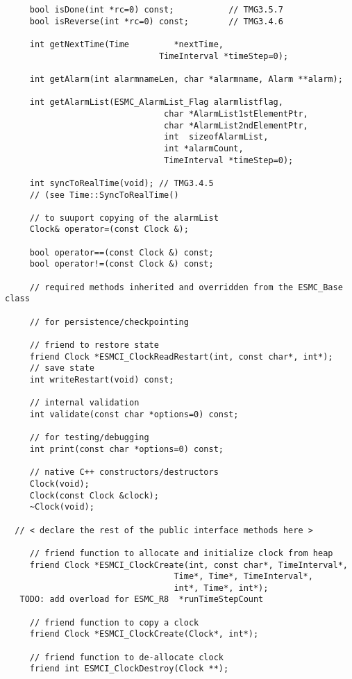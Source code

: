 \begin{verbatim}
     bool isDone(int *rc=0) const;           // TMG3.5.7
     bool isReverse(int *rc=0) const;        // TMG3.4.6
 
     int getNextTime(Time         *nextTime,
                               TimeInterval *timeStep=0);
 
     int getAlarm(int alarmnameLen, char *alarmname, Alarm **alarm);
 
     int getAlarmList(ESMC_AlarmList_Flag alarmlistflag,
                                char *AlarmList1stElementPtr, 
                                char *AlarmList2ndElementPtr,
                                int  sizeofAlarmList, 
                                int *alarmCount,
                                TimeInterval *timeStep=0);
 
     int syncToRealTime(void); // TMG3.4.5
     // (see Time::SyncToRealTime()
 
     // to suuport copying of the alarmList
     Clock& operator=(const Clock &);
 
     bool operator==(const Clock &) const;
     bool operator!=(const Clock &) const;
 
     // required methods inherited and overridden from the ESMC_Base class
 
     // for persistence/checkpointing
 
     // friend to restore state
     friend Clock *ESMCI_ClockReadRestart(int, const char*, int*);
     // save state
     int writeRestart(void) const;
 
     // internal validation
     int validate(const char *options=0) const;
 
     // for testing/debugging
     int print(const char *options=0) const;
 
     // native C++ constructors/destructors
     Clock(void);
     Clock(const Clock &clock);
     ~Clock(void);
 
  // < declare the rest of the public interface methods here >
 
     // friend function to allocate and initialize clock from heap
     friend Clock *ESMCI_ClockCreate(int, const char*, TimeInterval*,
                                  Time*, Time*, TimeInterval*,
                                  int*, Time*, int*);
   TODO: add overload for ESMC_R8  *runTimeStepCount
 
     // friend function to copy a clock
     friend Clock *ESMCI_ClockCreate(Clock*, int*);
 
     // friend function to de-allocate clock
     friend int ESMCI_ClockDestroy(Clock **);
 

\end{verbatim}
